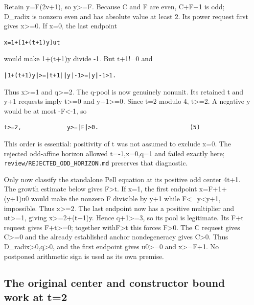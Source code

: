 Retain y=F(2v+1), so \textbar y\textbar\textgreater=\textbar F\textbar.
Because C and F are even, C+F+1 is odd; D\_radix is nonzero even and has
absolute value at least 2. Its power request first gives
x\textgreater=0. If x=0, the last endpoint

\begin{verbatim}
x=1+[1+(t+1)y]ut
\end{verbatim}

would make 1+(t+1)y divide -1. But t+1!=0 and

\begin{verbatim}
|1+(t+1)y|>=|t+1||y|-1>=|y|-1>1.
\end{verbatim}

Thus x\textgreater=1 and \textbar q\textbar\textgreater=2. The q-pool is
now genuinely nonunit. Its retained t and y+1 requests imply
t\textgreater=0 and y+1\textgreater=0. Since t=2 modulo 4,
t\textgreater=2. A negative y would be at most
-\textbar F\textbar\textless-1, so

\begin{verbatim}
t>=2,             y>=|F|>0.                          (5)
\end{verbatim}

This order is essential: positivity of t was not assumed to exclude x=0.
The rejected odd-affine horizon allowed t=-1,x=0,q=1 and failed exactly
here; \nolinkurl{review/REJECTED_ODD_HORIZON.md} preserves that
diagnostic.

Only now classify the standalone Pell equation at its positive odd
center 4t+1. The growth estimate below gives
\textbar F\textbar\textgreater t. If x=1, the first endpoint
x=F+1+(y+1)u0 would make the nonzero F divisible by y+1 while
\textbar F\textbar\textless=y\textless y+1, impossible. Thus
x\textgreater=2. The last endpoint now has a positive multiplier and
ut\textgreater=1, giving x\textgreater=2+(t+1)y. Hence
\textbar q+1\textbar\textgreater=3, so its pool is legitimate. Its F+t
request gives F+t\textgreater=0; together
with\textbar F\textbar\textgreater t this forces F\textgreater0. The C
request gives C\textgreater=0 and the already established anchor
nondegeneracy gives C\textgreater0. Thus
D\_radix\textgreater0,q\textgreater0, and the first endpoint gives
u0\textgreater=0 and x\textgreater=F+1. No postponed arithmetic sign is
used as its own premise.

\subsection{The original center and constructor bound work at
t=2}\label{the-original-center-and-constructor-bound-work-at-t2}

